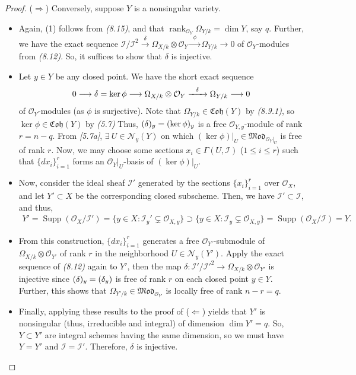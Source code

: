 \documentclass[11pt,a4paper,footinclude=true,headinclude=true]{scrbook} %
\DeclareMathOperator{\Supp}{Supp}
\let\Im\relax
\DeclareMathOperator{\Im}{Im}
\DeclareMathOperator{\rank}{rank}
\newcommand{\II}{\mathscr{I}}
\newcommand{\NN}{\mathcal{N}}
\newcommand{\OO}{\mathcal{O}}
\newcommand{\<}{\langle}
\newcommand{\>}{\rangle}
\newcommand{\MOD}{\mathfrak{Mod}}
\newcommand{\coh}{\mathfrak{Coh}}
\begin{document}
\begin{proof}
    ($\Rightarrow$) Conversely, suppose $Y$ is a nonsingular variety.
    \begin{itemize}
        \item Again, (1) follows from \textit{(8.15)}, and that $\rank_{\OO_Y}\Omega_{Y/k}=\dim Y$, say $q$. Further, we have the exact sequence $\II/\II^2\xrightarrow{~~\delta~~}\Omega_{X/k}\otimes\OO_Y\xrightarrow{~~\phi~~}\Omega_{Y/k}\longrightarrow0$ of $\OO_Y$-modules from \textit{(8.12)}. So, it suffices to show that $\delta$ is injective.
        \item Let $y\in Y$ be any closed point. We have the short exact sequence
        \begin{align*}
            0\longrightarrow\Im\delta=\ker\phi\longrightarrow\Omega_{X/k}\otimes\OO_Y\xrightarrow{~~\delta~~}\Omega_{Y/k}\longrightarrow0
        \end{align*}
        of $\OO_Y$-modules (as $\phi$ is surjective). Note that $\Omega_{Y/k}\in\coh(Y)$ by \textit{(8.9.1)}, so $\ker\phi\in\coh(Y)$ by \textit{(5.7)} Thus, $(\Im\delta)_y=(\ker\phi)_y$ is a free $\OO_{Y,y}$-module of rank $r=n-q$. From \textit{[5.7a]}, $\exists\ U\in\NN_y(Y)$ on which $(\ker\phi)|_U\in\MOD_{\OO_Y|_U}$ is free of rank $r$. Now, we may choose some sections $x_i\in\Gamma(U,\II)$ ($1\leq i\leq r$) such that $\{dx_i\}_{i=1}^r$ forms an $\OO_Y|_U$-basis of $(\ker\phi)|_U$.
        \item Now, consider the ideal sheaf $\II'$ generated by the sections $\{x_i\}_{i=1}^r$ over $\OO_X$, and let $Y'\subset X$ be the corresponding closed subscheme. Then, we have $\II'\subset\II$, and thus,
        \begin{align*}
            Y'=\Supp(\OO_X/\II')=\{y\in X:\II_y'\subsetneq\OO_{X,y}\}\supset\{y\in X:\II_y\subsetneq\OO_{X,y}\}=\Supp(\OO_X/\II)=Y.
        \end{align*}
        \item From this construction, $\{dx_i\}_{i=1}^r$ generates a free $\OO_{Y'}$-submodule of $\Omega_{X/k}\otimes\OO_{Y'}$ of rank $r$ in the neighborhood $U\in\NN_y(Y')$. Apply the exact sequence of \textit{(8.12)} again to $Y'$, then the map $\delta:\II'/\II'^2\to\Omega_{X/k}\otimes\OO_{Y'}$ is injective since $(\Im\delta)_y=\Im(\delta_y)$ is free of rank $r$ on each closed point $y\in Y$. Further, this shows that $\Omega_{Y'/k}\in\MOD_{\OO_{Y'}}$ is locally free of rank $n-r=q$.
        \item Finally, applying these results to the proof of ($\Leftarrow$) yields that $Y'$ is nonsingular (thus, irreducible and integral) of dimension $\dim Y'=q$. So, $Y\subset Y'$ are integral schemes having the same dimension, so we must have $Y=Y'$ and $\II=\II'$. Therefore, $\delta$ is injective.
    \end{itemize}
\end{proof}
\end{document}
